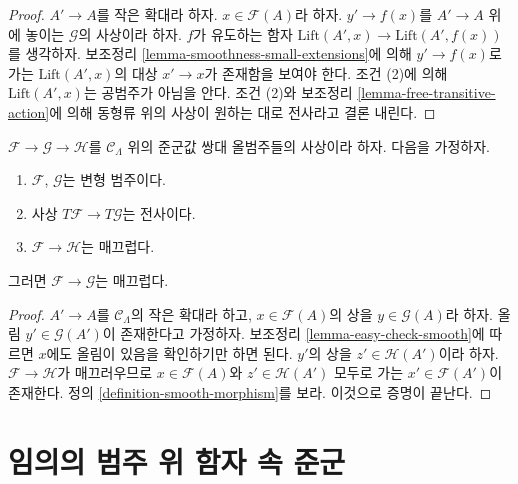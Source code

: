 \begin{proof}
$A' \to A$를 작은 확대라 하자. $x \in \mathcal{F}(A)$라 하자.
$y' \to f(x)$를 $A' \to A$ 위에 놓이는 $\mathcal{G}$의 사상이라 하자.
$f$가 유도하는 함자
$\text{Lift}(A', x) \to \text{Lift}(A', f(x))$를 생각하자.
보조정리 \ref{lemma-smoothness-small-extensions}에 의해
$y' \to f(x)$로 가는 $\text{Lift}(A', x)$의 대상
$x' \to x$가 존재함을 보여야 한다. 조건 (2)에 의해
$\text{Lift}(A', x)$는 공범주가 아님을 안다.
조건 (2)와 보조정리 \ref{lemma-free-transitive-action}에 의해 동형류 위의
사상이 원하는 대로 전사라고 결론 내린다.
\end{proof}

\begin{lemma}
\label{lemma-map-between-smooth}
$\mathcal{F} \to \mathcal{G} \to \mathcal{H}$를
$\mathcal{C}_\Lambda$ 위의 준군값 쌍대 올범주들의 사상이라 하자.
다음을 가정하자.
\begin{enumerate}
\item $\mathcal{F}$, $\mathcal{G}$는 변형 범주이다.
\item 사상 $T\mathcal{F} \to T\mathcal{G}$는 전사이다.
\item $\mathcal{F} \to \mathcal{H}$는 매끄럽다.
\end{enumerate}
그러면 $\mathcal{F} \to \mathcal{G}$는 매끄럽다.
\end{lemma}

\begin{proof}
$A' \to A$를 $\mathcal{C}_\Lambda$의 작은 확대라 하고,
$x \in \mathcal{F}(A)$의 상을 $y \in \mathcal{G}(A)$라 하자.
올림 $y' \in \mathcal{G}(A')$이 존재한다고 가정하자. 보조정리
\ref{lemma-easy-check-smooth}에 따르면 $x$에도 올림이 있음을 확인하기만
하면 된다. $y'$의 상을 $z' \in \mathcal{H}(A')$이라 하자.
$\mathcal{F} \to \mathcal{H}$가 매끄러우므로
$x \in \mathcal{F}(A)$와 $z' \in \mathcal{H}(A')$ 모두로 가는
$x' \in \mathcal{F}(A')$이 존재한다. 정의
\ref{definition-smooth-morphism}를 보라. 이것으로 증명이 끝난다.
\end{proof}





\section{임의의 범주 위 함자 속 준군}
\label{section-groupoids-arbitrary}

